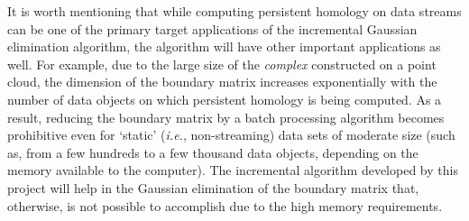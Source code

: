 \documentclass[11pt]{article}
\begin{document}
It is worth mentioning that while computing persistent homology on data streams can be one of the 
primary target applications of the incremental Gaussian elimination algorithm, the algorithm will 
have other important applications as well.  For example, due to the large size of the 
\emph{complex} constructed on a point cloud, the dimension of the boundary matrix increases 
exponentially with the number of data objects on which persistent homology is being computed.  
As a result, reducing the boundary matrix by a batch processing algorithm becomes prohibitive even 
for `static' (\emph{i.e.}, non-streaming) data sets of moderate size (such as, from a few hundreds 
to a few thousand data objects, depending on the memory available to the computer).  The 
incremental algorithm developed by this project will help in the Gaussian elimination of the 
boundary matrix that, otherwise, is not possible to accomplish due to the high memory requirements.





\end{document}
